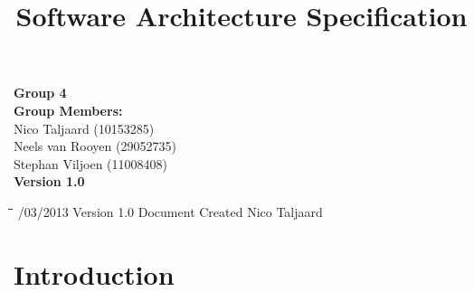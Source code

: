 \documentclass[12pt]{article}
\title{Software Architecture Specification}
\begin{document}

\maketitle

\vspace{4em}

\begin{center}%

  \LARGE {\bf Group 4}\\[2em]
  \LARGE {\bf Group Members:}\\[1em]
  \large
      Nico Taljaard			(10153285)	\\
      Neels van Rooyen		(29052735)	\\
	  Stephan Viljoen       (11008408)  \\[6em]
      
      {\bf Version 1.0}
    
\end{center}%

\newpage


\begin{tabbing}
\hspace*{3cm}\=\hspace*{3cm}\=\hspace*{8cm}\=\hspace*{3cm} /03/2013 \> Version 1.0 \> Document Created \> Nico Taljaard\\

\end{tabbing}

\newpage


\tableofcontents

\newpage


\section{Introduction}
\end{document}
